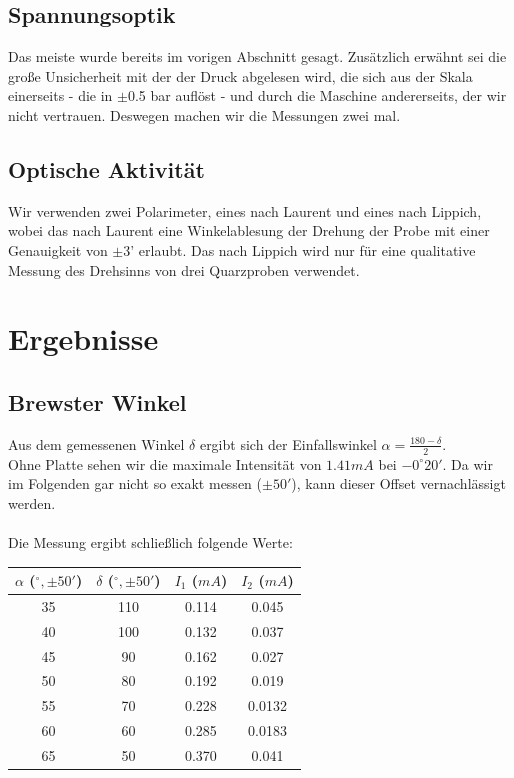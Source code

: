 \documentclass[twoside]{article}
\begin{document}
\subsection{Spannungsoptik}
Das meiste wurde bereits im vorigen Abschnitt gesagt. Zusätzlich erwähnt sei die große Unsicherheit mit der der Druck abgelesen wird, die sich aus der Skala einerseits - die in $\pm$0.5 bar auflöst - und durch die Maschine andererseits, der wir nicht vertrauen. Deswegen machen wir die Messungen zwei mal. 
\subsection{Optische Aktivität}
Wir verwenden zwei Polarimeter, eines nach Laurent und eines nach Lippich, wobei das nach Laurent eine Winkelablesung der Drehung der Probe mit einer Genauigkeit von $\pm$3' erlaubt. Das nach Lippich wird nur für eine qualitative Messung des Drehsinns von drei Quarzproben verwendet.
\section{Ergebnisse}
\subsection{Brewster Winkel}
Aus dem gemessenen Winkel $\delta$ ergibt sich der Einfallswinkel $\alpha=\frac{180-\delta}{2}$.\\
Ohne Platte sehen wir die maximale Intensität von $1.41 \si{mA}$ bei $-0^\circ20'$. Da wir im Folgenden gar nicht so exakt messen ($\pm 50'$), kann dieser Offset vernachlässigt werden.\\
\\
Die Messung ergibt schließlich folgende Werte:

\begin{table}[H]
\begin{center}
\begin{tabular}{|c|c|c|c|}
\hline
$\alpha$ ($^\circ, \pm 50'$) & $\delta$ ($^\circ, \pm 50'$) & $I_1$ ($\si{mA}$) & $I_2$ ($\si{mA}$)\\
\hline
35 & 110 & 0.114 & 0.045\\
40 & 100 & 0.132 & 0.037\\
45 & 90 & 0.162 & 0.027\\
50 & 80 & 0.192 & 0.019\\
55 & 70 & 0.228 & 0.0132\\
60 & 60 & 0.285 & 0.0183\\
65 & 50 & 0.370 & 0.041\\
\hline
\end{tabular}
\end{center}
\end{table}
\vspace{0.5mm}
\end{document}
